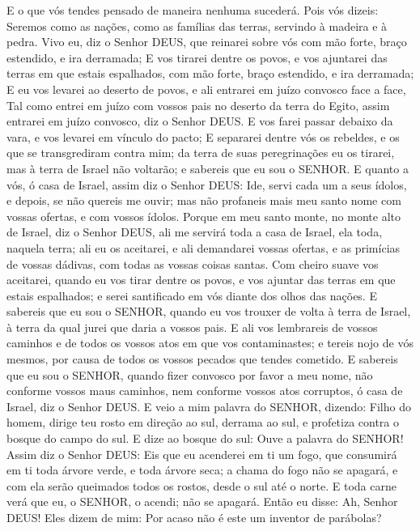 {  E o que vós tendes pensado de maneira nenhuma sucederá. Pois vós dizeis: Seremos como as nações, como as famílias das terras, servindo à madeira e à pedra.
  Vivo eu, diz o Senhor DEUS, que reinarei sobre vós com mão forte, braço estendido, e ira derramada;
  E vos tirarei dentre os povos, e vos ajuntarei das terras em que estais espalhados, com mão forte, braço estendido, e ira derramada;
  E eu vos levarei ao deserto de povos, e ali entrarei em juízo convosco face a face,
  Tal como entrei em juízo com vossos pais no deserto da terra do Egito, assim entrarei em juízo convosco, diz o Senhor DEUS.
  E vos farei passar debaixo da vara, e vos levarei em vínculo do pacto;
  E separarei dentre vós os rebeldes, e os que se transgrediram contra mim; da terra de suas peregrinações eu os tirarei, mas à terra de Israel não voltarão; e sabereis que eu sou o SENHOR.
  E quanto a vós, ó casa de Israel, assim diz o Senhor DEUS: Ide, servi cada um a seus ídolos, e depois, se não quereis me ouvir; mas não profaneis mais meu santo nome com vossas ofertas, e com vossos ídolos.
  Porque em meu santo monte, no monte alto de Israel, diz o Senhor DEUS, ali me servirá toda a casa de Israel, ela toda, naquela terra; ali eu os aceitarei, e ali demandarei vossas ofertas, e as primícias de vossas dádivas, com todas as vossas coisas santas.
  Com cheiro suave vos aceitarei, quando eu vos tirar dentre os povos, e vos ajuntar das terras em que estais espalhados; e serei santificado em vós diante dos olhos das nações.
  E sabereis que eu sou o SENHOR, quando eu vos trouxer de volta à terra de Israel, à terra da qual jurei
 que daria a vossos pais.
  E ali vos lembrareis de vossos caminhos e de todos os vossos atos em que vos contaminastes; e tereis nojo de vós mesmos, por causa de todos os vossos pecados que tendes cometido.
  E sabereis que eu sou o SENHOR, quando fizer convosco por favor a meu nome, não conforme vossos maus caminhos, nem conforme vossos atos corruptos, ó casa de Israel, diz o Senhor DEUS.
  E veio a mim palavra do SENHOR, dizendo:
  Filho do homem, dirige teu rosto em direção ao sul, derrama
{} ao sul, e profetiza contra o bosque do campo do sul.
  E dize ao bosque do sul: Ouve a palavra do SENHOR! Assim diz o Senhor DEUS: Eis que eu acenderei em ti um fogo, que consumirá em ti toda árvore verde, e toda árvore seca; a chama do fogo não se apagará, e com ela serão queimados todos os rostos, desde o sul até o norte.
  E toda carne verá
 que eu, o SENHOR, o acendi; não se apagará.
  Então eu disse: Ah, Senhor DEUS! Eles dizem de mim: Por acaso não é este um inventor de parábolas?
\par }

